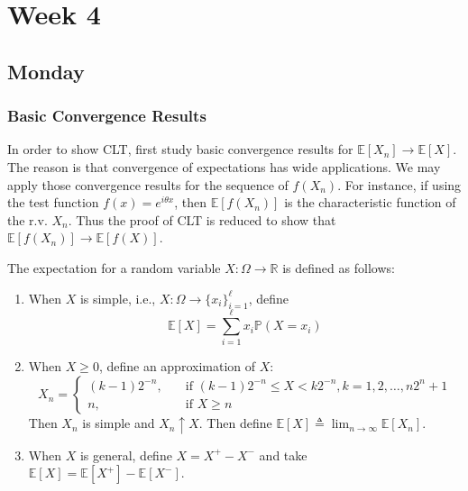 
\chapter{Week 4}

\section{Monday}


\subsection{Basic Convergence Results}

In order to show CLT, first study basic convergence results for $\mathbb{E}[X_n]\to\mathbb{E}[X]$.
The reason is that convergence of expectations has wide applications.
We may apply those convergence results for the sequence of $f(X_n)$.
For instance, if using the test function $f(x) = e^{i\theta x}$, then $\mathbb{E}[f(X_n)]$ is the characteristic function of the r.v. $X_n$.
Thus the proof of CLT is reduced to show that $\mathbb{E}[f(X_n)]\to\mathbb{E}[f(X)]$.


The expectation for a random variable $X:\Omega\to\mathbb{R}$ is defined as follows:
\begin{enumerate}
\item
When $X$ is simple, i.e., $X:\Omega\to\{x_i\}_{i=1}^{\ell}$, define
\[
\mathbb{E}[X] = \sum_{i=1}^{\ell}x_i\mathbb{P}(X=x_i)
\]
\item
When $X\ge0$, define an approximation of $X$:
\[
X_n = \left\{
\begin{aligned}
(k-1)2^{-n},&\quad\text{if $(k-1)2^{-n}\le X< k2^{-n}, k=1,2,\ldots,n2^n+1$}\\
n,&\quad\text{if $X\ge n$}
\end{aligned}
\right.
\]
Then $X_n$ is simple and $X_n\uparrow X$. Then define $\mathbb{E}[X]\triangleq \lim_{n\to\infty}\mathbb{E}[X_n]$.
\item
When $X$ is general, define $X = X^+-X^-$ and take $\mathbb{E}[X] = \mathbb{E}[X^+] - \mathbb{E}[X^-]$.
\end{enumerate}

